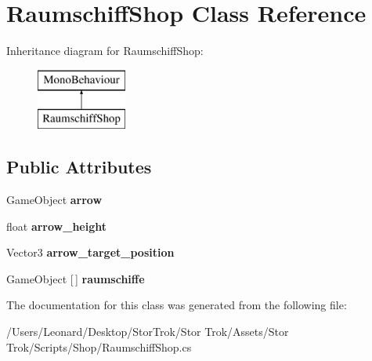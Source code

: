 \hypertarget{class_raumschiff_shop}{}\section{Raumschiff\+Shop Class Reference}
\label{class_raumschiff_shop}
Inheritance diagram for Raumschiff\+Shop\+:\begin{figure}[H]
\begin{center}
\leavevmode
\includegraphics[height=2.000000cm]{class_raumschiff_shop}
\end{center}
\end{figure}
\subsection*{Public Attributes}
\begin{DoxyCompactItemize}
\item 
\mbox{\label{class_raumschiff_shop_a43bed463be369cd868f8e6d68760ac0b}} 
Game\+Object {\bfseries arrow}
\item 
\mbox{\label{class_raumschiff_shop_a83d8f2582774ec965b8f7dfc366ef4ea}} 
float {\bfseries arrow\+\_\+height}
\item 
\mbox{\label{class_raumschiff_shop_a767e001f7278dc08135c2431266c19a8}} 
Vector3 {\bfseries arrow\+\_\+target\+\_\+position}
\item 
\mbox{\label{class_raumschiff_shop_a3fa42043b4688589fc47427d4d48a882}} 
Game\+Object \mbox{[}$\,$\mbox{]} {\bfseries raumschiffe}
\end{DoxyCompactItemize}


The documentation for this class was generated from the following file\+:\begin{DoxyCompactItemize}
\item 
/\+Users/\+Leonard/\+Desktop/\+Stor\+Trok/\+Stor Trok/\+Assets/\+Stor Trok/\+Scripts/\+Shop/Raumschiff\+Shop.\+cs\end{DoxyCompactItemize}
